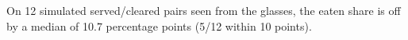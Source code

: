 On 12 simulated served/cleared pairs seen from the glasses, the eaten share is off by a median of 10.7 percentage points (5/12 within 10 points).
